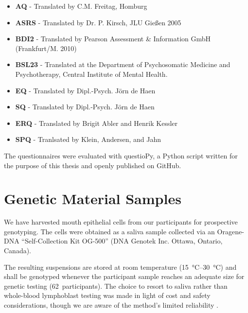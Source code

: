 	\begin{itemize}
	    \item \textbf{AQ} - Translated by C.M. Freitag, Homburg
	    \item \textbf{ASRS} - Translated by Dr. P. Kirsch, JLU Gießen 2005
	    \item \textbf{BDI2} - Translated by Pearson Assessment \& Information GmbH (Frankfurt/M. 2010)
	    \item \textbf{BSL23} - Translated at the Department of Psychosomatic Medicine and Psychotherapy, Central Institute of Mental Health.
	    \item \textbf{EQ} - Translated by Dipl.-Psych. Jörn de Haen
	    \item \textbf{SQ} - Translated by Dipl.-Psych. Jörn de Haen
	    \item \textbf{ERQ} - Translated by Brigit Abler and Henrik Kessler \citep{Abler2009}
	    \item \textbf{SPQ} - Tranlsated by Klein, Andersen, and Jahn \citep{Klein1997}
	\end{itemize}
	The questionnaires were evaluated with questioPy\citep{questiopy}, a Python script written for the purpose of this thesis and openly published on GitHub\citep{github}.
    \section{Genetic Material Samples}\label{sec:m_gms}
	We have harvested mouth epithelial cells from our participants for prospective genotyping.
	The cells were obtained as a saliva sample collected via an Oragene\textsuperscript{\small\textregistered}-DNA “Self-Collection Kit OG-500” (DNA Genotek Inc. Ottawa, Ontario, Canada).
	
	The resulting suspensions are stored at room temperature (\SIrange{15}{30}{\celsius}) and shall be genotyped whenever the participant sample reaches an adequate size for genetic testing (\SI{62}{participants}).
	The choice to resort to saliva rather than whole-blood lymphoblast testing was made in light of cost and safety considerations, though we are aware of the method's limited reliability \citep{Philibert2008}.
